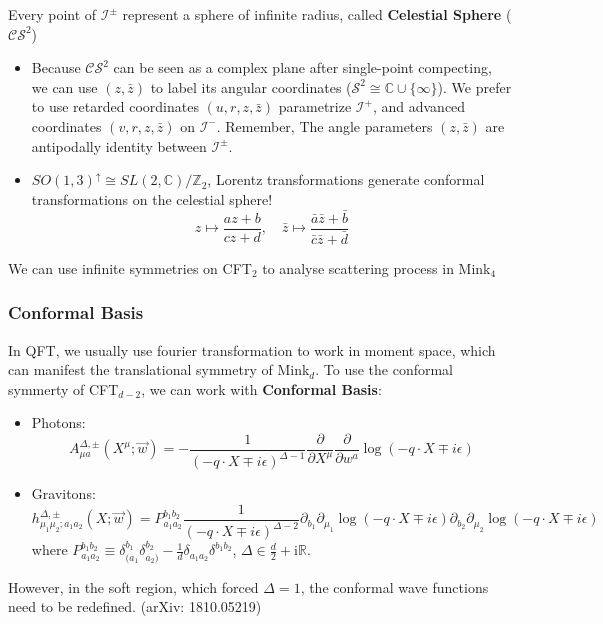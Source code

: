 \documentclass[aspectratio=169]{beamer}%
\begin{document}
	\begin{frame}
		\begin{definition}
			Every point of $\mathcal{I}^{\pm}$ represent a sphere of infinite radius, called \textbf{Celestial Sphere} ($\mathcal{CS}^2$)
		\end{definition}
		\begin{itemize}
		\item Because $\mathcal{CS}^2$ can be seen as a complex plane after single-point compecting, we can use $(z,\bar z)$ to label its angular coordinates ($\mathcal{S}^2\cong\mathbb{C}\cup \{\infty\}$). We prefer to use retarded coordinates $(u,r,z,\bar z)$ parametrize $\mathcal{I}^+$, and advanced coordinates $(v,r,z,\bar z)$ on $\mathcal{I}^-$. Remember, The angle parameters $(z,\bar z)$ are antipodally identity between $\mathcal{I}^\pm$.
		\item $SO(1,3)^\uparrow\cong SL(2,\mathbb{C})/\mathbb{Z}_2$, Lorentz transformations generate conformal transformations on the celestial sphere!
		\begin{equation}
			z\mapsto \frac{az+b}{cz+d},\quad \bar z\mapsto \frac{\bar a\bar z+\bar b}{\bar c\bar z+\bar d}
		\end{equation}
		\end{itemize}
		We can use infinite symmetries on CFT$_2$ to analyse scattering process in Mink$_4$
	\end{frame}
	\begin{frame}
		\frametitle{Conformal Basis}
		In QFT, we usually use fourier transformation to work in moment space, which can manifest the translational symmetry of Mink$_{d}$. To use the conformal symmerty of CFT$_{d-2}$, we can work with \textbf{Conformal Basis}:
		\begin{itemize}
			\item Photons:
			\begin{equation}
				A_{\mu a}^{\Delta,\pm}(X^{\mu};\vec{w})=-\frac1{(-q\cdot X\mp i\epsilon)^{\Delta-1}}\frac\partial{\partial X^{\mu}}\frac\partial{\partial w^a}\log(-q\cdot X\mp i\epsilon)
			\end{equation}
			\item Gravitons:
			\begin{equation}
				h_{\mu_1\mu_2;a_1a_2}^{\Delta,\pm}(X;\vec{w})=P_{a_{1}a_{2}}^{b_{1}b_{2}}\frac{1}{(-q\cdot X\mp i\epsilon)^{\Delta-2}}\partial_{b_{1}}\partial_{\mu_{1}}\log(-q\cdot X\mp i\epsilon)\partial_{b_{2}}\partial_{\mu_{2}}\log(-q\cdot X\mp i\epsilon)
			\end{equation}
			where $P_{a_1a_2}^{b_1b_2}\equiv\delta_{(a_1}^{b_1}\delta_{a_2)}^{b_2}-\frac{1}{d}\delta_{a_1a_2}\delta^{b_1b_2}$, $\Delta\in\frac d2+\text{i}\mathbb{R}$.
		\end{itemize}
		However, in the soft region, which forced $\Delta=1$, the conformal wave functions need to be redefined. (arXiv: 1810.05219)
	\end{frame}
\end{document}
